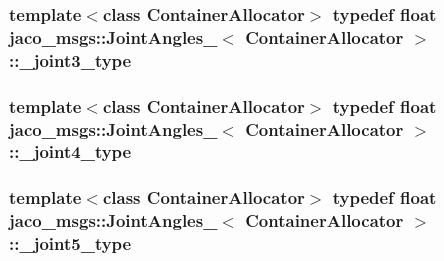 \subsubsection[{\texorpdfstring{\+\_\+joint3\+\_\+type}{_joint3_type}}]{\setlength{\rightskip}{0pt plus 5cm}template$<$class Container\+Allocator$>$ typedef float {\bf jaco\+\_\+msgs\+::\+Joint\+Angles\+\_\+}$<$ Container\+Allocator $>$\+::{\bf \+\_\+joint3\+\_\+type}}\hypertarget{structjaco__msgs_1_1JointAngles___a3ebebbb479a12b31cef37c2dee41d20b}{}\label{structjaco__msgs_1_1JointAngles___a3ebebbb479a12b31cef37c2dee41d20b}
\subsubsection[{\texorpdfstring{\+\_\+joint4\+\_\+type}{_joint4_type}}]{\setlength{\rightskip}{0pt plus 5cm}template$<$class Container\+Allocator$>$ typedef float {\bf jaco\+\_\+msgs\+::\+Joint\+Angles\+\_\+}$<$ Container\+Allocator $>$\+::{\bf \+\_\+joint4\+\_\+type}}\hypertarget{structjaco__msgs_1_1JointAngles___a4d55cf2b8660d9ab7896de50664b9ee1}{}\label{structjaco__msgs_1_1JointAngles___a4d55cf2b8660d9ab7896de50664b9ee1}
\subsubsection[{\texorpdfstring{\+\_\+joint5\+\_\+type}{_joint5_type}}]{\setlength{\rightskip}{0pt plus 5cm}template$<$class Container\+Allocator$>$ typedef float {\bf jaco\+\_\+msgs\+::\+Joint\+Angles\+\_\+}$<$ Container\+Allocator $>$\+::{\bf \+\_\+joint5\+\_\+type}}\hypertarget{structjaco__msgs_1_1JointAngles___ab4d7a4bc19b5a6d132666a21273df1ae}{}\label{structjaco__msgs_1_1JointAngles___ab4d7a4bc19b5a6d132666a21273df1ae}
